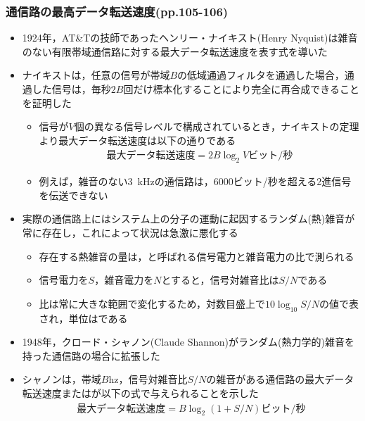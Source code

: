 \documentclass[a4paper]{ltjsarticle}
\begin{document}
    \subsubsection{通信路の最高データ転送速度(pp.105-106)}
      \begin{itemize}
        \item 1924年，AT\&Tの技師であったヘンリー・ナイキスト(Henry Nyquist)は雑音のない有限帯域通信路に対する最大データ転送速度を表す式を導いた
        \item ナイキストは，任意の信号が帯域$B$の低域通過フィルタを通過した場合，通過した信号は，毎秒$2B$回だけ標本化することにより完全に再合成できることを証明した
        \begin{itemize}
          \item 信号が$V$個の異なる信号レベルで構成されているとき，ナイキストの定理より最大データ転送速度は以下の通りである
            \begin{align}
              \text{最大データ転送速度} = 2B \log_2 V \text{ビット/秒}
            \end{align}
          \item 例えば，雑音のない\SI{3}{kHz}の通信路は，6000ビット/秒を超える2進信号を伝送できない
        \end{itemize}
        \item 実際の通信路上にはシステム上の分子の運動に起因するランダム(熱)雑音が常に存在し，これによって状況は急激に悪化する
        \begin{itemize}
          \item 存在する熱雑音の量は，と呼ばれる信号電力と雑音電力の比で測られる
          \item 信号電力を$S$，雑音電力を$N$とすると，信号対雑音比は$S/N$である
          \item 比は常に大きな範囲で変化するため，対数目盛上で$10 \log_{10} S/N$の値で表され，単位はである
				\end{itemize}
        \item 1948年，クロード・シャノン(Claude Shannon)がランダム(熱力学的)雑音を持った通信路の場合に拡張した				
        \item シャノンは，帯域$B$\si{hz}，信号対雑音比$S/N$の雑音がある通信路の最大データ転送速度またはが以下の式で与えられることを示した
          \begin{align}
            \text{最大データ転送速度} = B \log_2 (1+S/N) \text{ビット/秒}
          \end{align}
      \end{itemize}
\end{document}
